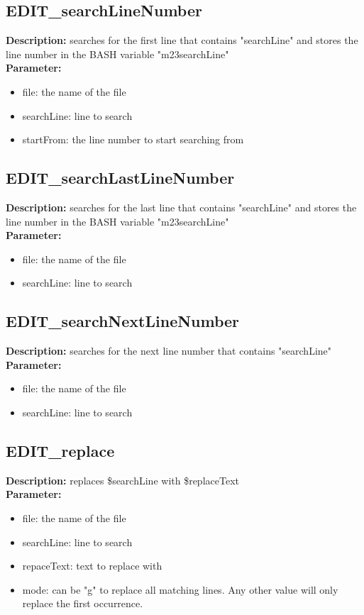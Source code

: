\subsection{EDIT\_searchLineNumber}
\textbf{Description:} searches for the first line that contains "searchLine" and stores the line number in the BASH variable "m23searchLine"\\
\textbf{Parameter:}
\begin{itemize}
\item file: the name of the file
\item searchLine: line to search
\item startFrom: the line number to start searching from
\end{itemize}

\subsection{EDIT\_searchLastLineNumber}
\textbf{Description:} searches for the last line that contains "searchLine" and stores the line number in the BASH variable "m23searchLine"\\
\textbf{Parameter:}
\begin{itemize}
\item file: the name of the file
\item searchLine: line to search
\end{itemize}

\subsection{EDIT\_searchNextLineNumber}
\textbf{Description:} searches for the next line number that contains "searchLine"\\
\textbf{Parameter:}
\begin{itemize}
\item file: the name of the file
\item searchLine: line to search
\end{itemize}

\subsection{EDIT\_replace}
\textbf{Description:} replaces \$searchLine with \$replaceText\\
\textbf{Parameter:}
\begin{itemize}
\item file: the name of the file
\item searchLine: line to search
\item repaceText: text to replace with
\item mode: can be "g" to replace all matching lines. Any other value will only replace the first occurrence.
\end{itemize}

